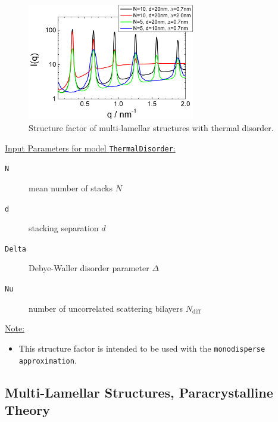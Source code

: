 \begin{figure}[htb]
\begin{center}
\includegraphics[width=0.65\textwidth,height=0.5\textwidth]{../images/structure_factor/Lamellar/TDLamellar.png}
\end{center}
\caption{Structure factor of multi-lamellar structures with thermal disorder. }
\label{fig:TDLamellar}
\end{figure}

\vspace{5mm}

\noindent
\underline{Input Parameters for model \texttt{ThermalDisorder}:}
\begin{description}
\item[\texttt{N}] mean number of stacks $N$
\item[\texttt{d}] stacking separation $d$
\item[\texttt{Delta}]  Debye-Waller disorder parameter $\Delta$
\item[\texttt{Nu}]   number of uncorrelated scattering bilayers $N_\text{diff}$
\end{description}

\noindent\underline{Note:}
\begin{itemize}
\item This structure factor is intended to be used with the \texttt{monodisperse approximation}.
\end{itemize}


\clearpage
\subsection{Multi-Lamellar Structures, Paracrystalline Theory} ~\\

